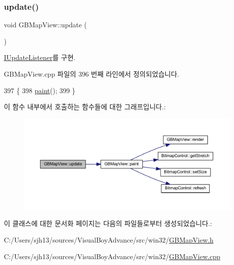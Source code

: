 \subsubsection{\texorpdfstring{update()}{update()}}
{\footnotesize\ttfamily void G\+B\+Map\+View\+::update (\begin{DoxyParamCaption}{ }\end{DoxyParamCaption})\hspace{0.3cm}{\ttfamily [virtual]}}



\mbox{\hyperlink{class_i_update_listener_ac03b85f52e858d0bbd08a4984b2cb929}{I\+Update\+Listener}}를 구현.



G\+B\+Map\+View.\+cpp 파일의 396 번째 라인에서 정의되었습니다.


\begin{DoxyCode}
397 \{
398   \mbox{\hyperlink{class_g_b_map_view_a42de669273417186b01ca6f8d06eb347}{paint}}();
399 \}
\end{DoxyCode}
이 함수 내부에서 호출하는 함수들에 대한 그래프입니다.\+:
\nopagebreak
\begin{figure}[H]
\begin{center}
\leavevmode
\includegraphics[width=350pt]{class_g_b_map_view_af907981b2a105364f52d9fc11030a200_cgraph}
\end{center}
\end{figure}


이 클래스에 대한 문서화 페이지는 다음의 파일들로부터 생성되었습니다.\+:\begin{DoxyCompactItemize}
\item 
C\+:/\+Users/sjh13/sources/\+Visual\+Boy\+Advance/src/win32/\mbox{\hyperlink{_g_b_map_view_8h}{G\+B\+Map\+View.\+h}}\item 
C\+:/\+Users/sjh13/sources/\+Visual\+Boy\+Advance/src/win32/\mbox{\hyperlink{_g_b_map_view_8cpp}{G\+B\+Map\+View.\+cpp}}\end{DoxyCompactItemize}

